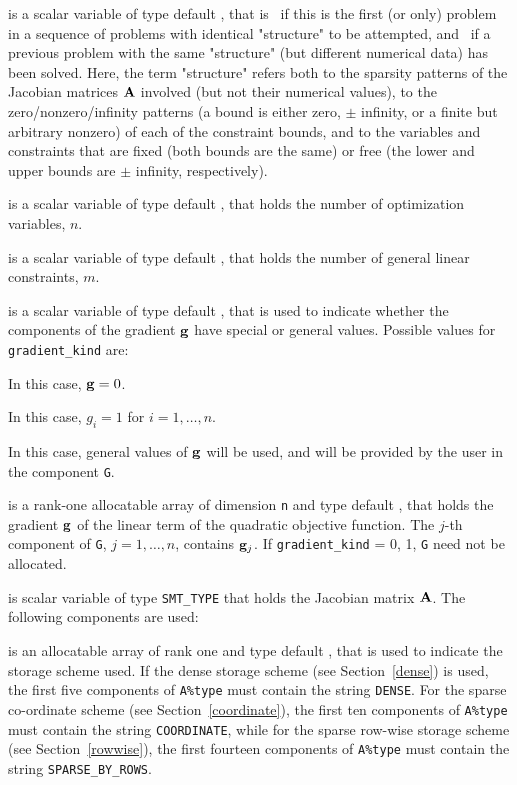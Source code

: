 \documentclass{galahad}
\begin{document}
\begin{description}

 is a scalar variable of type default \logical, 
 that is \true\ if this is the first (or only) problem in a sequence of 
 problems with identical "structure" to be attempted, and \false\ if 
 a previous problem with the same "structure" (but different
 numerical data) has been solved. Here, the term "structure" refers both to 
 the sparsity patterns of the Jacobian matrices ${\mathbf{A}}$ involved 
 (but not their numerical values), to the zero/nonzero/infinity patterns 
 (a bound is either zero, $\pm$ infinity, or a finite but arbitrary 
 nonzero) of each of the constraint bounds, and to the variables and constraints
 that are fixed (both bounds are the same) or free (the lower and upper
 bounds are $\pm$ infinity, respectively).

 is a scalar variable of type default \integer, 
 that holds the number of optimization variables, $n$.  
              
 is a scalar variable of type default \integer, 
 that holds the number of general linear constraints, $m$.
              
 is a scalar variable of type default \integer, 
that is used to indicate whether the components of the gradient ${\mathbf{g}}$ 
have special or general values. Possible values for {\tt gradient\_kind} are:
\begin{description}
  In this case, ${\mathbf{g}} = 0$.

 In this case, $g_{i} = 1$ for $i = 1, \ldots ,n$.

 In this case, general values of ${\mathbf{g}}$ will be used,
     and will be provided by the user in the component {\tt G}.
\end{description}

 is a rank-one allocatable array of dimension {\tt n} and type 
default \realdp, that holds the gradient ${\mathbf{g}}$ 
of the linear term of the quadratic objective function.
The $j$-th component of 
{\tt G}, $j = 1,  \ldots ,  n$, contains ${\mathbf{g}}_{j}$.
If {\tt gradient\_kind} {= 0, 1}, {\tt G} need not be allocated.

 is scalar variable of type {\tt SMT\_TYPE} 
that holds the Jacobian matrix ${\mathbf{A}}$. The following components are used:

\begin{description}

 is an allocatable array of rank one and type default \character, that
is used to indicate the storage scheme used. If the dense storage scheme 
(see Section~\ref{dense}) is used, 
the first five components of {\tt A\%type} must contain the
string {\tt DENSE}.
For the sparse co-ordinate scheme (see Section~\ref{coordinate}), 
the first ten components of {\tt A\%type} must contain the
string {\tt COORDINATE}, while 
for the sparse row-wise storage scheme (see Section~\ref{rowwise}),
the first fourteen components of {\tt A\%type} must contain the
string {\tt SPARSE\_BY\_ROWS}.


\end{description}
\end{description}
\end{document}
